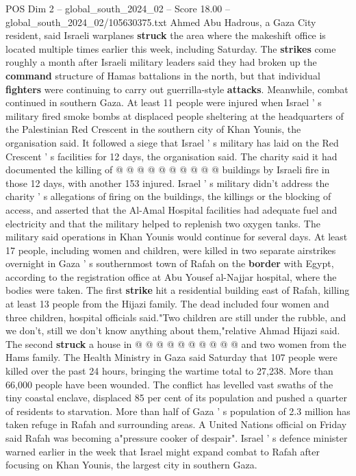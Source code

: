 \begin{textsample}{POS Dim 2 – global\_south\_2024\_02 – Score 18.00 – global\_south\_2024\_02/105630375.txt}
Ahmed Abu Hadrous, a Gaza City resident, said Israeli warplanes \textbf{struck} the area where the makeshift office is located multiple times earlier this week, including Saturday.
The \textbf{strikes} come roughly a month after Israeli military leaders said they had broken up the \textbf{command} structure of Hamas battalions in the north, but that individual \textbf{fighters} were continuing to carry out guerrilla-style \textbf{attacks}.
Meanwhile, combat continued in southern Gaza.
At least 11 people were injured when Israel ' s military fired smoke bombs at displaced people sheltering at the headquarters of the Palestinian Red Crescent in the southern city of Khan Younis, the organisation said.
It followed a siege that Israel ' s military has laid on the Red Crescent ' s facilities for 12 days, the organisation said.
The charity said it had documented the killing of @ @ @ @ @ @ @ @ @ @ buildings by Israeli fire in those 12 days, with another 153 injured.
Israel ' s military didn't address the charity ' s allegations of firing on the buildings, the killings or the blocking of access, and asserted that the Al-Amal Hospital facilities had adequate fuel and electricity and that the military helped to replenish two oxygen tanks.
The military said operations in Khan Younis would continue for several days.
At least 17 people, including women and children, were killed in two separate airstrikes overnight in Gaza ' s southernmost town of Rafah on the \textbf{border} with Egypt, according to the registration office at Abu Yousef al-Najjar hospital, where the bodies were taken.
The first \textbf{strike} hit a residential building east of Rafah, killing at least 13 people from the Hijazi family.
The dead included four women and three children, hospital officials said."Two children are still under the rubble, and we don't, still we don't know anything about them,"relative Ahmad Hijazi said.
The second \textbf{struck} a house in @ @ @ @ @ @ @ @ @ @ and two women from the Hams family.
The Health Ministry in Gaza said Saturday that 107 people were killed over the past 24 hours, bringing the wartime total to 27,238.
More than 66,000 people have been wounded.
The conflict has levelled vast swaths of the tiny coastal enclave, displaced 85 per cent of its population and pushed a quarter of residents to starvation.
More than half of Gaza ' s population of 2.3 million has taken refuge in Rafah and surrounding areas.
A United Nations official on Friday said Rafah was becoming a"pressure cooker of despair".
Israel ' s defence minister warned earlier in the week that Israel might expand combat to Rafah after focusing on Khan Younis, the largest city in southern Gaza.

\end{textsample}
